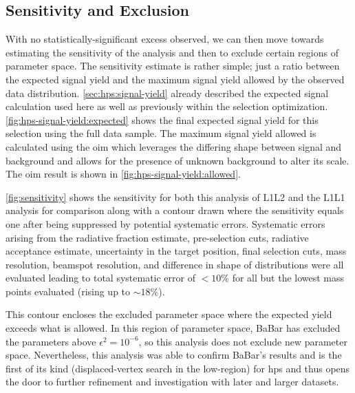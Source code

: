 \subsection{Sensitivity and Exclusion}
With no statistically-significant excess observed, we can then move towards estimating the sensitivity of
the analysis and then to exclude certain regions of parameter space.
The sensitivity estimate is rather simple; just a ratio between the expected signal yield
and the maximum signal yield allowed by the observed data distribution.
\cref{sec:hps:signal-yield} already described the expected signal calculation used here
as well as previously within the selection optimization.
\cref{fig:hps-signal-yield:expected} shows the final expected signal yield for this selection
using the full data sample.
The maximum signal yield allowed is calculated using the \ac{oim} \cite{yellin-oim:2002}
which leverages the differing shape between signal and background and allows for the presence
of unknown background to alter its scale.
The \ac{oim} result is shown in \cref{fig:hps-signal-yield:allowed}.

\cref{fig:sensitivity} shows the sensitivity for both this analysis of L1L2 and the L1L1 analysis
for comparison along with a contour drawn where the sensitivity equals one after being suppressed
by potential systematic errors.
Systematic errors arising from the radiative fraction estimate, pre-selection cuts, radiative acceptance
estimate, uncertainty in the target position, final selection cuts, mass resolution, beamspot
resolution, and difference in shape of \Psum distributions were all evaluated leading to total
systematic error of $<10\%$ for all but the lowest mass points evaluated (rising up to $\sim18\%$).

This contour encloses the excluded parameter space where the expected yield exceeds what is allowed.
In this region of parameter space, BaBar\cite{babar-2017} has excluded the parameters above
$\epsilon^2 = 10^{-6}$, so this analysis does not exclude new parameter space.
Nevertheless, this analysis was able to confirm BaBar's results and is the first of its kind
(displaced-vertex search in the low-\Psum region) for \ac{hps} and thus
opens the door to further refinement and investigation with later and larger datasets.

